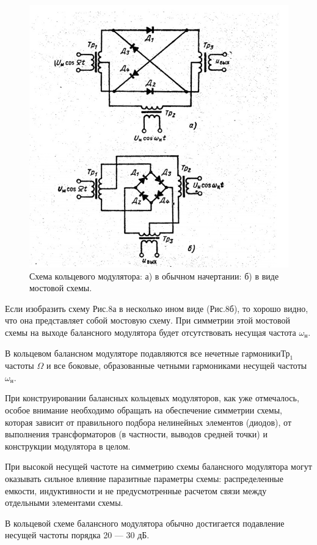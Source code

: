 \begin{figure}[h!]
	\centering
	\includegraphics[width=0.8\linewidth]{fig/fig8}
	\caption{ Схема кольцевого модулятора: а) в обычном начертании: б) в виде
мостовой схемы.}
	\label{fig:fig8}
\end{figure}

Если изобразить схему Рис.8а в несколько ином виде (Рис.8б), то хорошо видно, что она представляет собой мостовую схему. При симметрии этой мостовой схемы на выходе балансного модулятора будет отсутствовать несущая частота $\omega_{\text{н}}$.

В кольцевом балансном модуляторе подавляются все нечетные гармоники$\text{Тр}_1$ частоты $\Omega$ и все боковые, образованные четными гармониками несущей частоты $\omega_{\text{н}}$.

При конструировании балансных кольцевых модуляторов, как уже отмечалось, особое внимание необходимо обращать на обеспечение симметрии схемы, которая зависит от правильного подбора нелинейных элементов (диодов), от выполнения трансформаторов (в частности, выводов средней точки) и конструкции модулятора в целом.

При высокой несущей частоте на симметрию схемы балансного модулятора могут оказывать сильное влияние паразитные параметры схемы: распределенные емкости, индуктивности и не предусмотренные расчетом связи между отдельными элементами схемы.

В кольцевой схеме балансного модулятора обычно достигается подавление несущей частоты порядка 20 — 30 дБ.

